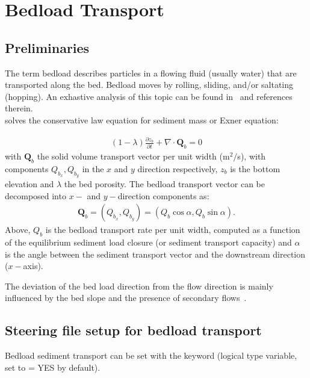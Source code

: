 \chapter[Bedload sediment transport]{Bedload Transport}\label{sec:BedloadTransport}

\section{Preliminaries}
The term bedload describes particles in a flowing fluid (usually water) that are transported along the bed. Bedload moves by rolling, sliding, and/or saltating (hopping). An exhastive analysis of this topic can be found in~\cite{GarciaBook2006} and references therein.\\

\sisyphe{} solves the conservative law equation for sediment mass or Exner equation:

\begin{align}
(1-\lambda)\frac{\partial z_b}{\partial t} + \nabla\cdot \mathbf Q_b = 0
\label{eq:Exner}
\end{align}
with $\mathbf Q_b$ the solid volume transport vector per unit width (m$^2/$s), with components $Q_{b_x}, Q_{b_y}$ in the $x$ and $y$ direction respectively, $z_b$ is the bottom elevation and $\lambda$ the bed porosity. The bedload transport vector can be decomposed into $x-$ and $y-$direction components as:
\begin{align}
\mathbf Q_b = (Q_{b_x}, Q_{b_y}) = (Q_b \cos\alpha, Q_b \sin\alpha).
\label{eq:bedloadtransportvector}
\end{align}
Above, $Q_b$ is the bedload transport rate per unit width, computed as a function of the equilibrium sediment load closure (or sediment transport capacity) and $\alpha$ is the angle between the sediment transport vector and the downstream direction ($x-$axis).

The deviation of the bed load direction from the flow direction is mainly influenced by the bed slope and the presence of secondary flows~\cite{Talmon95}.

\section{Steering file setup for bedload transport}
Bedload sediment transport can be set with the keyword  (logical type variable, set to {\ttfamily = YES} by default).

